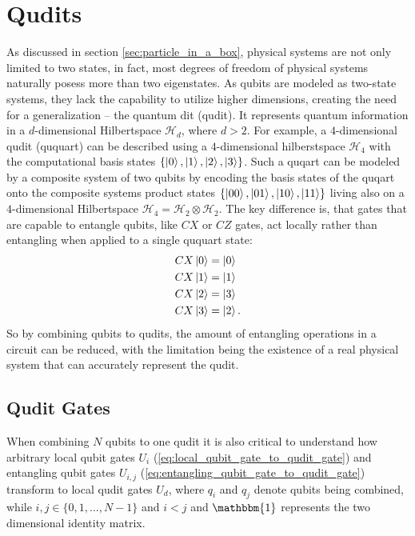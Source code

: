 \section{Qudits}
  As discussed in section \ref{sec:particle_in_a_box}, physical systems are not only limited to two states, in fact, most degrees of freedom of physical systems naturally posess more than two eigenstates.
  As qubits are modeled as two-state systems, they lack the capability to utilize higher dimensions, creating the need for a generalization -- the quantum dit (qudit).
  It represents quantum information in a $d$-dimensional Hilbertspace $\mathcal{H}_d$, where $d>2$. For example, a $4$-dimensional qudit (ququart) can be described using a $4$-dimensional hilberstspace $\mathcal{H}_4$ with the computational basis states $\{\ket{0},\ket{1},\ket{2},\ket{3}\}$.
  Such a quqart can be modeled by a composite system of two qubits by encoding the basis states of the quqart onto the composite systems product states $\{\ket{00},\ket{01},\ket{10},\ket{11}\}$ living also on a $4$-dimensional Hilbertspace $\mathcal{H}_4=\mathcal{H}_2\otimes\mathcal{H}_2$. The key difference is, that gates that are capable to entangle qubits, like $CX$ or $CZ$ gates, act locally rather than entangling when applied to a single ququart state:
  \begin{equation}
    \label{eq:quqart_cx_local_gate}
    \begin{split}
      CX\ket{0}&=\ket{0} \\
      CX\ket{1}&=\ket{1} \\
      CX\ket{2}&=\ket{3} \\
      CX\ket{3}&=\ket{2}.
    \end{split}
  \end{equation}
  So by combining qubits to qudits, the amount of entangling operations in a circuit can be reduced, with the limitation being the existence of a real physical system that can accurately represent the qudit.
  \subsection{Qudit Gates}
    When combining $N$ qubits to one qudit it is also critical to understand how arbitrary local qubit gates $U_i$ (\ref{eq:local_qubit_gate_to_qudit_gate}) and entangling qubit gates $U_{i,j}$ (\ref{eq:entangling_qubit_gate_to_qudit_gate}) transform to local qudit gates $U_d$, where $q_i$ and $q_j$ denote qubits being combined, while $i,j \in \{0,1,...,N-1\}$ and $i<j$ and $\mathbbm{1}$ represents the two dimensional identity matrix.

